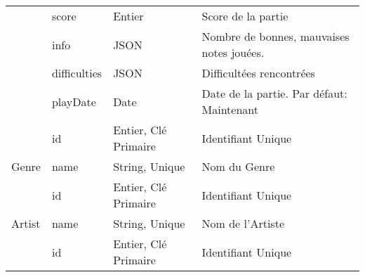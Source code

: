 \begin{longtable}[c]{@{}|p{}|p{}|p{}|p{}|@{}}
														& score                                                & Entier                                                                                   & Score de la partie                                                                       \\* \cmidrule(l){2-4} 
														& info                                                 & JSON                                                                                     & Nombre de bonnes, mauvaises notes jouées.                                                \\* \cmidrule(l){2-4} 
														& difficulties                                         & JSON                                                                                     & Difficultées rencontrées                                                                 \\* \cmidrule(l){2-4} 
								                        & playDate                                             & Date                                                                                     & Date de la partie. Par défaut: Maintenant                                                \\* \midrule
														& id                                                   & Entier, Clé Primaire                                                                     & Identifiant Unique                                                                       \\* \cmidrule(l){2-4} 
	\multirow{-2}{*}{Genre}                             & name                                                 & String, Unique                                                                           & Nom du Genre                                                                             \\* \midrule
														& id                                                   & Entier, Clé Primaire                                                                     & Identifiant Unique                                                                       \\* \cmidrule(l){2-4} 
	\multirow{-2}{*}{Artist}                            & name                                                 & String, Unique                                                                           & Nom de l’Artiste                                                                         \\* \midrule
														& id                                                   & Entier, Clé Primaire                                                                     & Identifiant Unique                                                                       \\* \cmidrule(l){2-4} 

\end{longtable}
